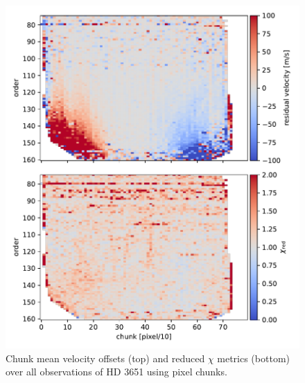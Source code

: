 \begin{figure}
    \centering
    \includegraphics{figures-5/pixel-chunk-resid.pdf}
    \caption{Chunk mean velocity offsets (top) and reduced $\chi$ metrics (bottom) over all observations of HD 3651 using pixel chunks.}
    \label{fig:pixel-chunk-resid}
\end{figure}

